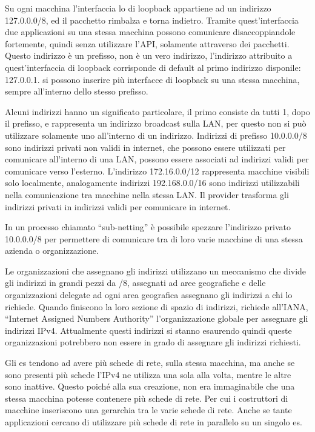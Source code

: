 \documentclass{article}
\numberwithin{equation}{subsection}
\begin{document}
Su ogni macchina l'interfaccia lo di loopback appartiene ad un indirizzo 127.0.0.0/8, ed il pacchetto rimbalza e torna indietro. Tramite quest'interfaccia 
due applicazioni su una stessa macchina possono comunicare disaccoppiandole fortemente, quindi senza utilizzare l'API, solamente attraverso dei pacchetti. 
Questo indirizzo è un prefisso, non è un vero indirizzo, l'indirizzo attribuito a quest'interfaccia di loopback corrisponde di default al primo indirizzo 
disponile: 127.0.0.1. si possono inserire più interfacce di loopback su una stessa macchina, sempre all'interno dello stesso prefisso. 

Alcuni indirizzi hanno un significato particolare, il primo consiste da tutti 1, dopo il prefisso, e rappresenta un indirizzo broadcast sulla LAN, per questo non 
si può utilizzare solamente uno all'interno di un indirizzo. 
Indirizzi di prefisso 10.0.0.0/8 sono indirizzi privati non validi in internet, che possono essere utilizzati per comunicare all'interno di una LAN, possono essere 
associati ad indirizzi validi per comunicare verso l'esterno. 
L'indirizzo 172.16.0.0/12 rappresenta macchine visibili solo localmente, analogamente indirizzi 192.168.0.0/16 sono indirizzi utilizzabili nella comunicazione tra 
macchine nella stessa LAN. Il provider trasforma gli indirizzi privati in indirizzi validi per comunicare in internet.

In un processo chiamato ``sub-netting'' è possibile spezzare l'indirizzo privato 10.0.0.0/8 per permettere di comunicare tra di loro varie macchine di una stessa azienda 
o organizzazione. 



Le organizzazioni che assegnano gli indirizzi utilizzano un meccanismo che divide gli indirizzi in grandi pezzi da /8, assegnati ad aree geografiche e delle organizzazioni 
delegate ad ogni area geografica assegnano gli indirizzi a chi lo richiede. Quando finiscono la loro sezione di spazio di indirizzi, richiede all'IANA, ``Internet Assigned Numbers Authority'' 
l'organizzazione globale per assegnare gli indirizzi IPv4. 
Attualmente questi indirizzi si stanno esaurendo quindi queste organizzazioni potrebbero non essere in grado di assegnare gli indirizzi richiesti. 

Gli es tendono ad avere più schede di rete, sulla stessa macchina, ma anche se sono presenti più schede l'IPv4 ne utilizza una sola alla volta, mentre le altre sono 
inattive. Questo poiché alla sua creazione, non era immaginabile che una stessa macchina potesse contenere più schede di rete. Per cui i costruttori di macchine 
inseriscono una gerarchia tra le varie schede di rete. Anche se tante applicazioni cercano di utilizzare più schede di rete in parallelo su un singolo es. 
\end{document}
